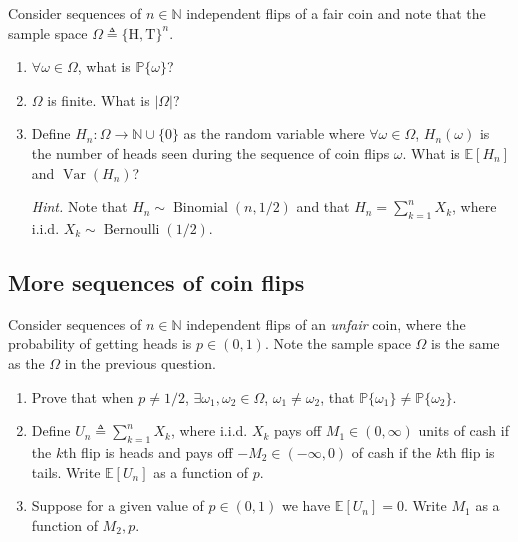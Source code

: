 \documentclass{article}
\numberwithin{equation}{section}
\begin{document}
Consider sequences of $ n \in \mathbb{N} $ independent flips of a fair coin
and note that the sample space $ \Omega \triangleq \{\text{H}, \text{T}\}^n $.
\begin{enumerate}[label = \alph*.]
    \item
    $ \forall \omega \in \Omega $, what is $ \mathbb{P}\{\omega\} $?

    \item
    $ \Omega $ is finite. What is $ |\Omega| $?

    \item
    Define $ H_n : \Omega \rightarrow \mathbb{N} \cup \{0\} $ as the random
    variable where $ \forall \omega \in \Omega $, $ H_n(\omega) $ is the
    number of heads seen during the sequence of coin flips $ \omega $. What
    is $ \mathbb{E}[H_n] $ and $ \operatorname{Var}(H_n) $?

    \medskip
    
    \textit{Hint.} Note that $ H_n \sim \operatorname{Binomial}(n, 1 / 2) $
    and that $ H_n = \sum_{k = 1}^nX_k $, where i.i.d.
    $ X_k \sim \operatorname{Bernoulli}(1 / 2) $.
\end{enumerate}

\subsection{More sequences of coin flips}

Consider sequences of $ n \in \mathbb{N} $ independent flips of an
\textit{unfair} coin, where the probability of getting heads is
$ p \in (0, 1) $. Note the sample space $ \Omega $ is the same as the
$ \Omega $ in the previous question.
\begin{enumerate}[label = \alph*.]
    \item
    Prove that when $ p \ne 1 / 2 $, $ \exists \omega_1, \omega_2 \in
    \Omega $, $ \omega_1 \ne \omega_2 $, that $ \mathbb{P}\{\omega_1\} \ne
    \mathbb{P}\{\omega_2\} $.

    \item
    Define $ U_n \triangleq \sum_{k = 1}^nX_k $, where i.i.d.
    $ X_k $ pays off $ M_1 \in (0, \infty) $ units of cash if the $ k $th
    flip is heads and pays off $ -M_2 \in (-\infty, 0) $ of cash if the
    $ k $th flip is tails. Write $ \mathbb{E}[U_n] $ as a function of $ p $.

    \item
    Suppose for a given value of $ p \in (0, 1) $ we have
    $ \mathbb{E}[U_n] = 0 $. Write $ M_1 $ as a function of $ M_2, p $.
\end{enumerate}
\end{document}
